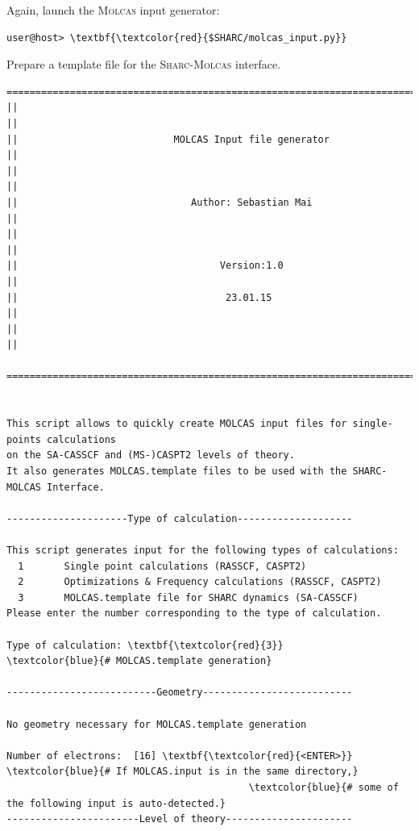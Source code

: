 \documentclass[a4paper,11pt,DIV=15,openany]{scrbook}
\newcommand{\sharc}{\textsc{Sharc}}
\begin{document}
Again, launch the \textsc{Molcas} input generator:
\begin{Verbatim}[commandchars=\\\{\}]
user@host> \textbf{\textcolor{red}{$SHARC/molcas_input.py}}
\end{Verbatim}
Prepare a template file for the \sharc-\textsc{Molcas} interface.
\begin{oframed}
\footnotesize\begin{Verbatim}[commandchars=\\\{\}]
  ================================================================================
||                                                                                ||
||                           MOLCAS Input file generator                          ||
||                                                                                ||
||                              Author: Sebastian Mai                             ||
||                                                                                ||
||                                   Version:1.0                                  ||
||                                    23.01.15                                    ||
||                                                                                ||
  ================================================================================


This script allows to quickly create MOLCAS input files for single-points calculations
on the SA-CASSCF and (MS-)CASPT2 levels of theory. 
It also generates MOLCAS.template files to be used with the SHARC-MOLCAS Interface.
  
---------------------Type of calculation--------------------

This script generates input for the following types of calculations:
  1       Single point calculations (RASSCF, CASPT2)
  2       Optimizations & Frequency calculations (RASSCF, CASPT2)
  3       MOLCAS.template file for SHARC dynamics (SA-CASSCF)
Please enter the number corresponding to the type of calculation.

Type of calculation: \textbf{\textcolor{red}{3}}        \textcolor{blue}{# MOLCAS.template generation}

--------------------------Geometry--------------------------

No geometry necessary for MOLCAS.template generation

Number of electrons:  [16] \textbf{\textcolor{red}{<ENTER>}}        \textcolor{blue}{# If MOLCAS.input is in the same directory,}
                                          \textcolor{blue}{# some of the following input is auto-detected.}
-----------------------Level of theory----------------------


\end{Verbatim}
\end{oframed}
\end{document}
